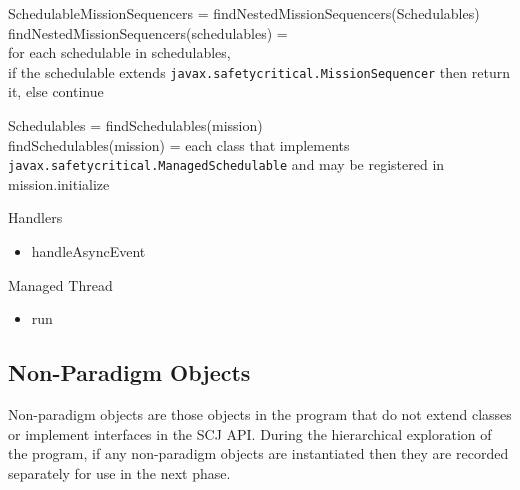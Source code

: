 \documentclass[10pt,a4paper]{article}
\newenvironment{ttSection}{\ttfamily}{\par}
\begin{document}
\begin{ttSection}
SchedulableMissionSequencers = findNestedMissionSequencers(Schedulables)\\

findNestedMissionSequencers(schedulables) = \\
for each schedulable in schedulables, \\
if the schedulable extends \texttt{javax.safetycritical.MissionSequencer} then return it, else continue
\end{ttSection}

\begin{ttSection}
Schedulables = findSchedulables(mission)\\

findSchedulables(mission) = each class that implements \texttt{javax.safetycritical.ManagedSchedulable} and may be registered in mission.initialize
\end{ttSection}


\item Handlers
\begin{itemize}
\item handleAsyncEvent
\end{itemize}
\item Managed Thread
\begin{itemize}
\item run
\end{itemize}



































\subsection{Non-Paradigm Objects}

Non-paradigm objects are those objects in the program that do not extend classes or implement interfaces in the SCJ API. During the hierarchical exploration of the program, if any non-paradigm objects are instantiated then they are recorded separately for use in the next phase.
\end{document}
